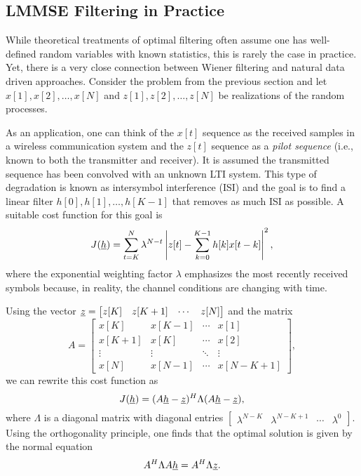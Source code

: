\subsection{LMMSE Filtering in Practice}

While theoretical treatments of optimal filtering often assume one has well-defined random variables with known statistics, this is rarely the case in practice.
Yet, there is a very close connection between Wiener filtering and natural data driven approaches.
Consider the problem from the previous section and let $x[1], x[2], \ldots, x[N]$ and $z[1], z[2], \ldots, z[N]$ be realizations of the random processes.

As an application, one can think of the $x[t]$ sequence as the received samples in a wireless communication system and the $z[t]$ sequence as a \emph{pilot sequence} (i.e., known to both the transmitter and receiver).
It is assumed the transmitted sequence has been convolved with an unknown LTI system.
This type of degradation is known as intersymbol interference (ISI) and the goal is to find a linear filter $h[0],h[1],\ldots,h[K-1]$ that removes as much ISI as possible.
A suitable cost function for this goal is
\[ J(\underline{h}) = \sum_{t=K}^N \lambda^{N-t} \left| z[t] - \sum_{k=0}^{K-1} h[k] x[t-k] \right|^2, \]
where the exponential weighting factor $\lambda$ emphasizes the most recently received symbols because, in reality, the channel conditions are changing with time.

Using the vector $\underline{z} = \begin{bmatrix} z[K] & z[K+1] & \cdots & z[N] \end{bmatrix}$ and the matrix
\[ A = \begin{bmatrix} x[K] & x[K-1] & \cdots & x[1] \\ x[K+1] & x[K] & \cdots & x[2] \\ \vdots & \vdots & \ddots & \vdots \\ x[N] & x[N-1] & \cdots & x[N-K+1] \end{bmatrix} , \]
we can rewrite this cost function as
\[ J(\underline{h}) = (A\underline{h}-\underline{z})^H \Lambda (A\underline{h}-\underline{z}), \]
where $\Lambda$ is a diagonal matrix with diagonal entries $\begin{bmatrix} \lambda^{N-K} & \lambda^{N-K+1} & \cdots & \lambda^0 \end{bmatrix}$.
Using the orthogonality principle, one finds that the optimal solution is given by the normal equation
\[ A^H \Lambda A \underline{h} = A^H \Lambda \underline{z}. \]

